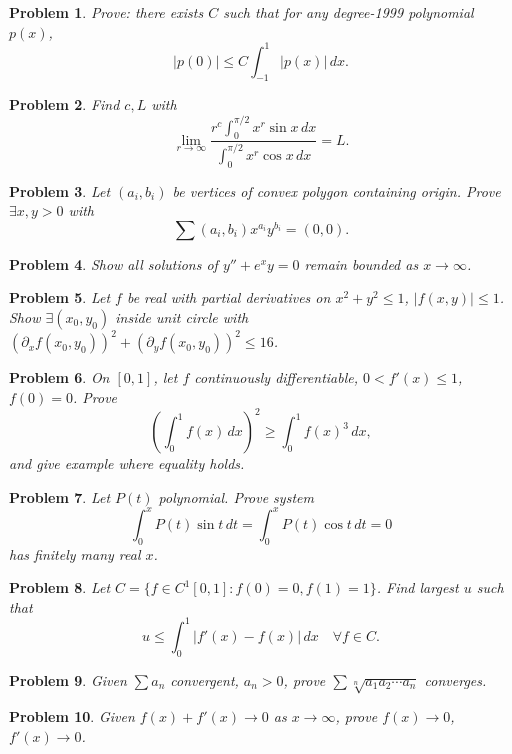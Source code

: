 \documentclass[12pt]{article}
\newtheorem{problem}{Problem}
\begin{document}
\begin{problem}
Prove: there exists $C$ such that for any degree-1999 polynomial $p(x)$,
\[
|p(0)|\leq C\int_{-1}^1|p(x)|\,dx.
\]
\end{problem}

\begin{problem}
Find $c,L$ with
\[
\lim_{r\to\infty}\frac{r^c\int_0^{\pi/2} x^r\sin x\,dx}{\int_0^{\pi/2} x^r\cos x\,dx}=L.
\]
\end{problem}

\begin{problem}
Let $(a_i,b_i)$ be vertices of convex polygon containing origin. Prove $\exists x,y>0$ with
\[\sum (a_i,b_i)x^{a_i}y^{b_i}=(0,0).\]
\end{problem}

\begin{problem}
Show all solutions of $y''+e^xy=0$ remain bounded as $x\to\infty$.
\end{problem}

\begin{problem}
Let $f$ be real with partial derivatives on $x^2+y^2\leq1$, $|f(x,y)|\leq1$. Show $\exists(x_0,y_0)$ inside unit circle with $(\partial_x f(x_0,y_0))^2+(\partial_y f(x_0,y_0))^2\leq16$.
\end{problem}

\begin{problem}
On $[0,1]$, let $f$ continuously differentiable, $0<f'(x)\leq1$, $f(0)=0$. Prove
\[\left(\int_0^1 f(x)\,dx\right)^2\geq \int_0^1 f(x)^3\,dx,\]
and give example where equality holds.
\end{problem}

\begin{problem}
Let $P(t)$ polynomial. Prove system
\[\int_0^x P(t)\sin t\,dt=\int_0^x P(t)\cos t\,dt=0\]
has finitely many real $x$.
\end{problem}

\begin{problem}
Let $C=\{f\in C^1[0,1]: f(0)=0,f(1)=1\}$. Find largest $u$ such that
\[
u\leq \int_0^1|f'(x)-f(x)|\,dx\quad \forall f\in C.
\]
\end{problem}

\begin{problem}
Given $\sum a_n$ convergent, $a_n>0$, prove $\sum \sqrt[n]{a_1a_2\cdots a_n}$ converges.
\end{problem}

\begin{problem}
Given $f(x)+f'(x)\to0$ as $x\to\infty$, prove $f(x)\to0$, $f'(x)\to0$.
\end{problem}
\end{document}
